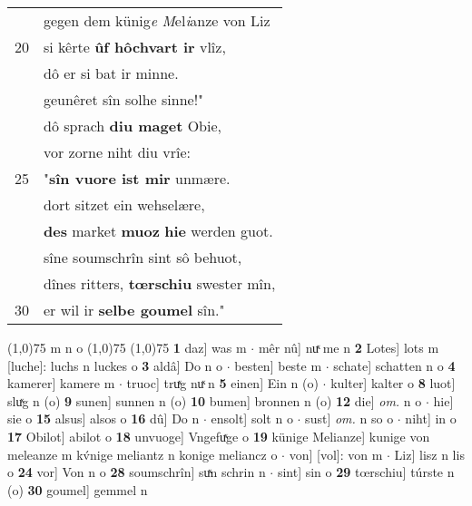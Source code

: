 \documentclass[8pt,a4paper,notitlepage]{article}
\begin{document}
\begin{table}[ht]
\begin{minipage}[t]{0.5\linewidth}
\begin{tabular}{rl}
 & gegen dem künig\textit{e} \textit{M}el\textit{i}anze von Liz\\ 
20 & si kêrte \textbf{ûf hôchvart ir} vlîz,\\ 
 & dô er si bat ir minne.\\ 
 & geunêret sîn solhe sinne!"\\ 
 & dô sprach \textbf{diu maget} Obie,\\ 
 & vor zorne niht diu vrîe:\\ 
25 & "\textbf{sîn vuore ist mir} unmære.\\ 
 & dort sitzet ein wehselære,\\ 
 & \textbf{des} market \textbf{muoz} \textbf{hie} werden guot.\\ 
 & sîne soumschrîn sint sô behuot,\\ 
 & dînes ritters, \textbf{tœrschiu} swester mîn,\\ 
30 & er wil ir \textbf{selbe goumel} sîn."\\ 
\end{tabular}
\scriptsize
\line(1,0){75} \newline
m n o \newline
\line(1,0){75} \newline
\newline
\line(1,0){75} \newline
\textbf{1} daz] was m  $\cdot$ mêr nû] nuͯ me n \textbf{2} Lotes] lots m [luche]: luchs n luckes o \textbf{3} aldâ] Do n o  $\cdot$ besten] beste m  $\cdot$ schate] schatten n o \textbf{4} kamerer] kamere m  $\cdot$ truoc] truͯg nuͯ n \textbf{5} einen] Ein n (o)  $\cdot$ kulter] kalter o \textbf{8} luot] sluͯg n (o) \textbf{9} sunen] sunnen n (o) \textbf{10} bumen] bronnen n (o) \textbf{12} die] \textit{om.} n o  $\cdot$ hie] sie o \textbf{15} alsus] alsos o \textbf{16} dû] Do n  $\cdot$ ensolt] solt n o  $\cdot$ sust] \textit{om.} n so o  $\cdot$ niht] in o \textbf{17} Obilot] abilot o \textbf{18} unvuoge] Vngefuͯge o \textbf{19} künige Melianze] kunige von meleanze m kv́nige meliantz n konige meliancz o  $\cdot$ von] [vol]: von m  $\cdot$ Liz] lisz n lis o \textbf{24} vor] Von n o \textbf{28} soumschrîn] suͯn schrin n  $\cdot$ sint] sin o \textbf{29} tœrschiu] túrste n (o) \textbf{30} goumel] gemmel n \newline
\end{minipage}
\end{table}
\newpage
\end{document}
